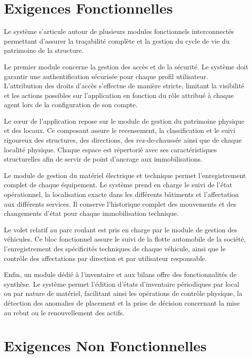 \section{Exigences Fonctionnelles}

Le système s'articule autour de plusieurs modules fonctionnels interconnectés permettant d'assurer la traçabilité complète et la gestion du cycle de vie du patrimoine de la structure.

Le premier module concerne la gestion des accès et de la sécurité. Le système doit garantir une authentification sécurisée pour chaque profil utilisateur. L'attribution des droits d'accès s'effectue de manière stricte, limitant la visibilité et les actions possibles sur l'application en fonction du rôle attribué à chaque agent lors de la configuration de son compte.

Le cœur de l'application repose sur le module de gestion du patrimoine physique et des locaux. Ce composant assure le recensement, la classification et le suivi rigoureux des structures, des directions, des rez-de-chaussée ainsi que de chaque localité physique. Chaque espace est répertorié avec ses caractéristiques structurelles afin de servir de point d'ancrage aux immobilisations.

Le module de gestion du matériel électrique et technique permet l'enregistrement complet de chaque équipement. Le système prend en charge le suivi de l'état opérationnel, la localisation exacte dans les différents bâtiments et l'affectation aux différents services. Il conserve l'historique complet des mouvements et des changements d'état pour chaque immobilisation technique.

Le volet relatif au parc roulant est pris en charge par le module de gestion des véhicules. Ce bloc fonctionnel assure le suivi de la flotte automobile de la société, l'enregistrement des spécificités techniques de chaque véhicule, ainsi que le contrôle des affectations par direction et par utilisateur responsable.

Enfin, un module dédié à l'inventaire et aux bilans offre des fonctionnalités de synthèse. Le système permet l'édition d'états d'inventaire périodiques par local ou par nature de matériel, facilitant ainsi les opérations de contrôle physique, la détection des anomalies de placement et la prise de décision concernant la mise au rebut ou le renouvellement des actifs.

\section{Exigences Non Fonctionnelles}

